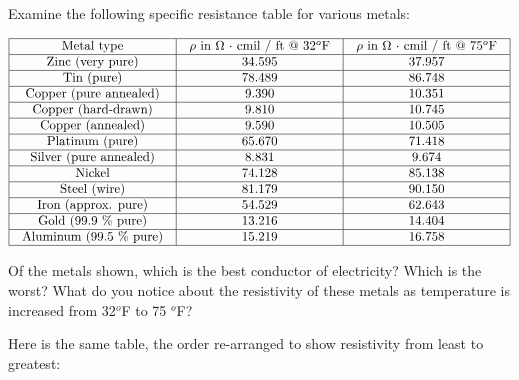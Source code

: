 

Examine the following specific resistance table for various metals:


$$\vbox{\offinterlineskip
\halign{\strut
\vrule \quad\hfil # \ \hfil & 
\vrule \quad\hfil # \ \hfil & 
\vrule \quad\hfil # \ \hfil \vrule \cr
\noalign{\hrule}
%
Metal type & $\rho$ in $\Omega$ $\cdot$ cmil / ft @ 32$^{o}$F & $\rho$ in $\Omega$ $\cdot$ cmil / ft @ 75$^{o}$F \cr
%
\noalign{\hrule}
%
Zinc (very pure) & 34.595 & 37.957 \cr
%
\noalign{\hrule}
%
Tin (pure) & 78.489 & 86.748 \cr
%
\noalign{\hrule}
%
Copper (pure annealed) & 9.390 & 10.351 \cr
%
\noalign{\hrule}
%
Copper (hard-drawn) & 9.810 & 10.745 \cr
%
\noalign{\hrule}
%
Copper (annealed) & 9.590 & 10.505 \cr
%
\noalign{\hrule}
%
Platinum (pure) & 65.670 & 71.418 \cr
%
\noalign{\hrule}
%
Silver (pure annealed) & 8.831 & 9.674 \cr
%
\noalign{\hrule}
%
Nickel & 74.128 & 85.138 \cr
%
\noalign{\hrule}
%
Steel (wire) & 81.179 & 90.150 \cr
%
\noalign{\hrule}
%
Iron (approx. pure) & 54.529 & 62.643 \cr
%
\noalign{\hrule}
%
Gold (99.9 \% pure) & 13.216 & 14.404 \cr
%
\noalign{\hrule}
%
Aluminum (99.5 \% pure) & 15.219 & 16.758 \cr
%
\noalign{\hrule}
} %
}$$ %

Of the metals shown, which is the best conductor of electricity?  Which is the worst?  What do you notice about the resistivity of these metals as temperature is increased from 32$^{o}$F to 75 $^{o}$F?







Here is the same table, the order re-arranged to show resistivity from least to greatest:


